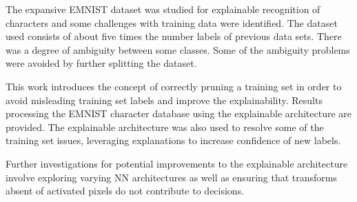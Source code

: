 \documentclass[conference]{IEEEtran}
\begin{document}
The expansive EMNIST dataset was studied for explainable recognition of
characters and some challenges with training data were identified.  The dataset
used consists of about five times the number labels of previous data sets. There
was a degree of ambiguity between some classes. Some of the ambiguity problems
were avoided by further splitting the dataset.

This work introduces the concept of correctly pruning a training set in order
to avoid misleading training set labels and improve the explainability. Results
processing the EMNIST character database using the explainable architecture are
provided. The explainable architecture was also used to resolve some of the
training set issues, leveraging explanations to increase confidence of new
labels.

Further investigations for potential improvements to the explainable
architecture involve exploring varying NN architectures as well as ensuring that
transforms absent of activated pixels do not contribute to decisions. 



\end{document}
